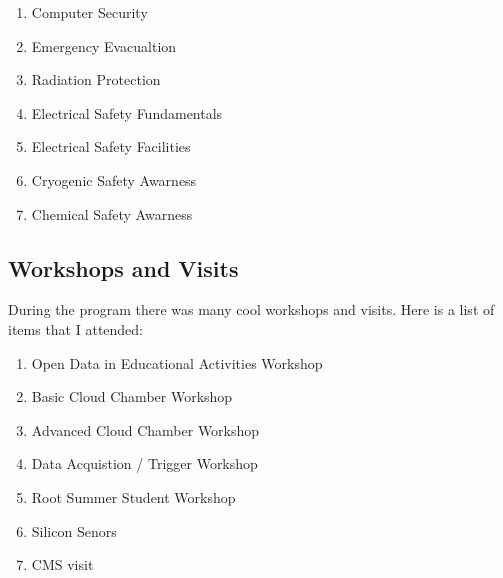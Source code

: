 \documentclass[12pt,a4paper]{article}
\begin{document}
\begin{enumerate}
\item Computer Security
\item Emergency Evacualtion
\item Radiation Protection
\item Electrical Safety Fundamentals
\item Electrical Safety Facilities
\item Cryogenic Safety Awarness
\item Chemical Safety Awarness
\end{enumerate}

\subsection{Workshops and Visits}
During the program there was many cool workshops and visits. Here is a list of items that I attended:

\begin{enumerate}

\item Open Data in Educational Activities Workshop
\item Basic Cloud Chamber Workshop
\item Advanced Cloud Chamber Workshop
\item Data Acquistion / Trigger Workshop
\item Root Summer Student Workshop
\item Silicon Senors
\item CMS visit
\end{enumerate} 
\end{document}
